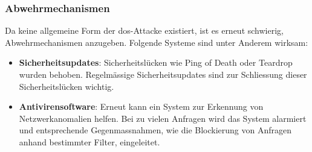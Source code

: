 \documentclass[11pt, a4paper]{article}
\begin{document}
\subsubsection{Abwehrmechanismen}
Da keine allgemeine Form der \gls{dos}-Attacke existiert, ist es erneut schwierig, Abwehrmechanismen anzugeben. Folgende Systeme sind unter Anderem wirksam:

\begin{itemize}
	\item \textbf{Sicherheitsupdates}: Sicherheitslücken wie Ping of Death oder Teardrop wurden behoben. Regelmässige Sicherheitsupdates sind zur Schliessung dieser Sicherheitslücken wichtig.
	\item \textbf{Antivirensoftware}: Erneut kann ein System zur Erkennung von Netzwerkanomalien helfen. Bei zu vielen Anfragen wird das System alarmiert und entsprechende Gegenmassnahmen, wie die Blockierung von Anfragen anhand bestimmter Filter, eingeleitet.
\end{itemize}
\end{document}
